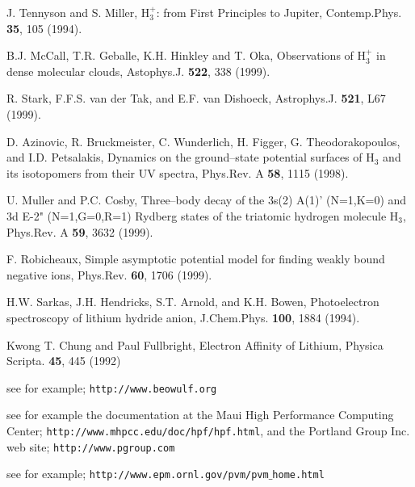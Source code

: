 \begin{thebibliography}{999}
J. Tennyson and S. Miller, 
H$_3^+$: from First Principles to Jupiter,
Contemp.Phys. {\bf 35}, 105 (1994).

B.J. McCall, T.R. Geballe, K.H. Hinkley and T. Oka,
Observations of H$_3^+$ in dense molecular clouds,
Astophys.J. {\bf 522}, 338 (1999).

R. Stark, F.F.S. van der Tak, and E.F. van Dishoeck,
Astrophys.J. {\bf 521}, L67 (1999).

D. Azinovic, R. Bruckmeister, C. Wunderlich, H. Figger,
G. Theodorakopoulos, and I.D. Petsalakis,
Dynamics on the ground--state potential surfaces of H$_3$
and its isotopomers from their UV spectra,
Phys.Rev. A {\bf 58}, 1115 (1998).

U. Muller and P.C. Cosby,
Three--body decay of the 3s(2) A(1)' (N=1,K=0) and 3d E-2"
(N=1,G=0,R=1) Rydberg states of the triatomic hydrogen
molecule H$_3$,
Phys.Rev. A {\bf 59}, 3632 (1999).

F. Robicheaux,
Simple asymptotic potential model for finding
weakly bound negative ions,
Phys.Rev. {\bf 60}, 1706 (1999).

H.W. Sarkas, J.H. Hendricks, S.T. Arnold, and K.H. Bowen,
Photoelectron spectroscopy of lithium hydride anion,
J.Chem.Phys. {\bf 100}, 1884 (1994).


Kwong T. Chung and Paul Fullbright,
Electron Affinity of Lithium,
Physica Scripta. {\bf 45}, 445 (1992)

see for example; {\tt http://www.beowulf.org}

see for example the documentation at the 
Maui High Performance Computing Center;
{\tt http://www.mhpcc.edu/doc/hpf/hpf.html},
and the Portland Group Inc. web site;
{\tt http://www.pgroup.com}

see for example; 
{\tt http://www.epm.ornl.gov/pvm/pvm$\_$home.html}


\end{thebibliography}




